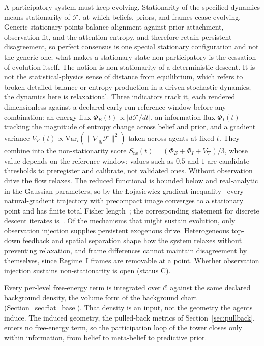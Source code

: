 \documentclass[11pt]{article}
\begin{document}
A participatory system must keep evolving. Stationarity of the specified dynamics means stationarity of $\mathcal{F}$, at which beliefs, priors, and frames cease evolving. Generic stationary points balance alignment against prior attachment, observation fit, and the attention entropy, and therefore retain persistent disagreement, so perfect consensus is one special stationary configuration and not the generic one; what makes a stationary state non-participatory is the cessation of evolution itself. The notion is non-stationarity of a deterministic descent. It is not the statistical-physics sense of distance from equilibrium, which refers to broken detailed balance or entropy production in a driven stochastic dynamics; the dynamics here is relaxational. Three indicators track it, each rendered dimensionless against a declared early-run reference window before any combination: an energy flux $\Phi_E(t) \propto |d\mathcal{F}/dt|$, an information flux $\Phi_I(t)$ tracking the magnitude of entropy change across belief and prior, and a gradient variance $V_{\nabla}(t) \propto \mathrm{Var}_{i}(\|\nabla_{q_i}\mathcal{F}\|^2)$ taken across agents at fixed $t$. They combine into the non-stationarity score $S_{\mathrm{ns}}(t) = (\Phi_E + \Phi_I + V_{\nabla})/3$, whose value depends on the reference window; values such as $0.5$ and $1$ are candidate thresholds to preregister and calibrate, not validated ones. Without observation drive the flow relaxes. The reduced functional is bounded below and real-analytic in the Gaussian parameters, so by the {\L}ojasiewicz gradient inequality~\cite{Lojasiewicz1963} every natural-gradient trajectory with precompact image converges to a stationary point and has finite total Fisher length~\cite[Ch.~7, the finite-duration proposition]{DennisGaugeVFE2026}; the corresponding statement for discrete descent iterates is~\cite{absil2005convergence}. Of the mechanisms that might sustain evolution, only observation injection supplies persistent exogenous drive. Heterogeneous top-down feedback and spatial separation shape how the system relaxes without preventing relaxation, and frame differences cannot maintain disagreement by themselves, since Regime~I frames are removable at a point. Whether observation injection sustains non-stationarity is open (status C).

Every per-level free-energy term is integrated over $\mathcal{C}$ against the same declared background density, the volume form of the background chart (Section~\ref{sec:flat_base}). That density is an input, not the geometry the agents induce. The induced geometry, the pulled-back metrics of Section~\ref{sec:pullback}, enters no free-energy term, so the participation loop of the tower closes only within information, from belief to meta-belief to predictive prior.
\end{document}
